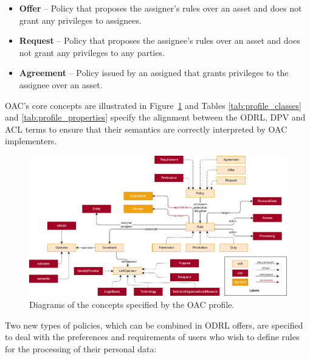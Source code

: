 \begin{itemize}
    \item \textbf{Offer} -- Policy that proposes the assigner's rules over an asset and does not grant any privileges to assignees.
    \item \textbf{Request} -- Policy that proposes the assignee's rules over an asset and does not grant any privileges to any parties.
    \item \textbf{Agreement} -- Policy issued by an assigned that grants privileges to the assignee over an asset.
\end{itemize}

OAC's core concepts are illustrated in Figure~\ref{fig:oac_diagram} and Tables \ref{tab:profile_classes} and \ref{tab:profile_properties} specify the alignment between the ODRL, DPV and ACL terms to ensure that their semantics are correctly interpreted by OAC implementers.


\begin{figure}[htbp]
    \centering
    \includegraphics[width=\linewidth]{figures/chapter-4/oac_diagram.png}
    \caption{Diagrams of the concepts specified by the OAC profile.}
    \label{fig:oac_diagram}
\end{figure}

Two new types of policies, which can be combined in ODRL offers, are specified to deal with the preferences and requirements of users who wish to define rules for the processing of their personal data:

